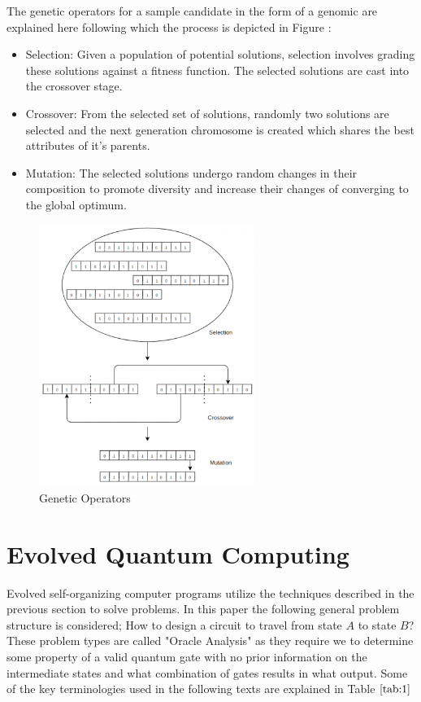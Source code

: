 \documentclass[conference]{IEEEtran}
\begin{document}
The genetic operators for a sample candidate in the form of a genomic are explained here following which the process is depicted in Figure :
\begin{itemize}
\item Selection: Given a population of potential solutions, selection involves grading these solutions against a fitness function. The selected solutions are cast into the crossover stage.
\item Crossover: From the selected set of solutions, randomly two solutions are selected and the next generation chromosome is created which shares the best attributes of it's parents.
\item Mutation: The selected solutions undergo random changes in their composition to promote diversity and increase their changes of converging to the global optimum.
\end{itemize}

\begin{figure}[!t]
\centering\includegraphics[width=7cm]{p2.png}
\caption{Genetic Operators}
\label{p3}
\end{figure}

\section{Evolved Quantum Computing}

Evolved self-organizing computer programs utilize the techniques described in the previous section to solve problems. In this paper the following general problem structure is considered; How to design a circuit to travel from state $\textit{A}$ to state $\textit{B}$? These problem types are called "Oracle Analysis" as they require we to determine some property of a valid quantum gate with no prior information on the intermediate states and what combination of gates results in what output. Some of the key terminologies used in the following texts are explained in Table $\ref{tab:1}$
\end{document}
